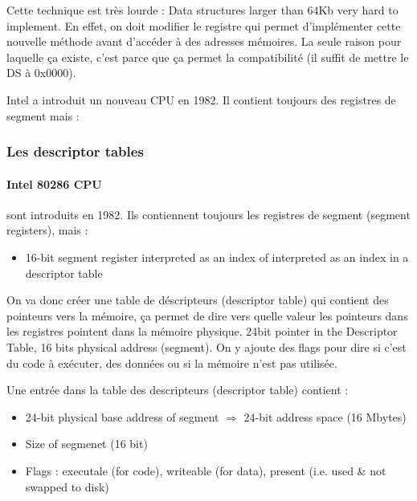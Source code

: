 Cette technique est très lourde : Data structures larger than 64Kb very hard to
implement. En effet, on doit modifier le registre qui permet
d'implémenter cette nouvelle méthode avant d'accéder à des adresses
mémoires. La seule raison pour laquelle ça existe, c'est parce que ça
permet la compatibilité (il suffit de mettre le DS à 0x0000). \newline

Intel a introduit un nouveau CPU en 1982. Il contient toujours des
registres de segment mais : \newline

\subsubsection{Les descriptor tables}

\paragraph{Intel 80286 CPU} sont introduits en 1982. Ils contiennent
toujours les registres de segment (segment registers), mais : 

\bigskip
\begin{itemize}
    \item 16-bit segment register interpreted as an index of interpreted
        as an index in a descriptor table
\end{itemize}
\bigskip

On va donc créer une table de déscripteurs (descriptor table) qui
contient des pointeurs vers la mémoire, ça permet de dire vers quelle
valeur les pointeurs dans les registres pointent dans la mémoire
physique. 24bit pointer in the Descriptor Table, 16 bits physical
address (segment). On y ajoute des flags pour dire si c'est du code à
exécuter, des données ou si la mémoire n'est pas utilisée. \newline

Une entrée dans la table des descripteurs (descriptor table) contient :

\begin{itemize}
    \item 24-bit physical base address of segment $\Rightarrow$ 24-bit
        address space (16 Mbytes)
    \item Size of segmenet (16 bit)
    \item Flags : executale (for code), writeable (for data), present
        (i.e. used \& not swapped to disk)
\end{itemize}

